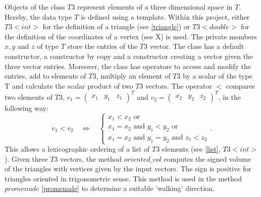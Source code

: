 \documentclass[10pt]{article}
\begin{document}
Objects of the class $T3$ represent elements of a three dimensional space in $T$. Hereby, the data type $T$ is defined using a template. Within this project, either $T3<int>$ for the definition of a triangle (see \ref{triangle}) or $T3<double>$ for the definition of the coordinates of a vertex (see X) is used. The private members $x,y$ and $z$ of type $T$ store the entries of the $T3$ vector. The class has a default constructor, a constructor by copy and a constructor creating a vector given the three vector entries. Moreover, the class has operators to access and modify the entries, add to elements of $T3$, multiply an element of $T3$ by a scalar of the type T and calculate the scalar product of two $T3$ vectors. The operator $<$ compares two elements of $T3$, $v_1 = \begin{pmatrix} x_1 & y_1 & z_1 \end{pmatrix}^T$ and $v_2 = \begin{pmatrix} x_2 & y_2 & z_2 \end{pmatrix}^T$, in the following way:
$$ v_1 < v_2 \quad \Leftrightarrow \quad \begin{cases}
 x_1 < x_2 \text{ or }\\
 x_1 = x_2 \text{ and } y_1 < y_2 \text{ or }\\
 x_1 = x_2 \text{ and } y_1 = y_2 \text{ and } z_1 < z_2
\end{cases}. $$ 
This allows a lexicographic ordering of a list of $T3$ elements (see \ref{list}, $T3<int>$). Given three $T3$ vectors, the method $ oriented\_vol $ computes the signed volume of the triangles with vertices given by the input vectors. The sign is positive for triangles oriented in trigonometric sense. This method is used in the method $promenade$ \ref{promenade} to determine a suitable 'walking' direction. \\
\end{document}
